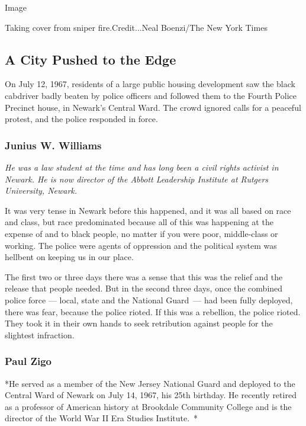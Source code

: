 Image

Taking cover from sniper fire.Credit...Neal Boenzi/The New York Times

\hypertarget{a-city-pushed-to-the-edge}{%
\subsection{A City Pushed to the Edge}\label{a-city-pushed-to-the-edge}}

On July 12, 1967, residents of a large public housing development saw
the black cabdriver badly beaten by police officers and followed them to
the Fourth Police Precinct house, in Newark's Central Ward. The crowd
ignored calls for a peaceful protest, and the police responded in force.

\hypertarget{junius-w-williams}{%
\subsubsection{Junius W. Williams}\label{junius-w-williams}}

\emph{He was a law student at the time and has long been a civil rights
activist in Newark. He is now director of the Abbott Leadership
Institute at Rutgers University, Newark.}

It was very tense in Newark before this happened, and it was all based
on race and class, but race predominated because all of this was
happening at the expense of and to black people, no matter if you were
poor, middle-class or working. The police were agents of oppression and
the political system was hellbent on keeping us in our place.

The first two or three days there was a sense that this was the relief
and the release that people needed. But in the second three days, once
the combined police force --- local, state and the National Guard~---
had been fully deployed, there was fear, because the police rioted. If
this was a rebellion, the police rioted. They took it in their own hands
to seek retribution against people for the slightest infraction.

\hypertarget{paul-zigo}{%
\subsubsection{Paul Zigo}\label{paul-zigo}}

*He served as a member of the New Jersey National Guard and deployed to
the Central Ward of Newark on July 14, 1967, his 25th birthday. He
recently retired as a professor of American history at Brookdale
Community College and is the director of the World War II Era Studies
Institute.~*


